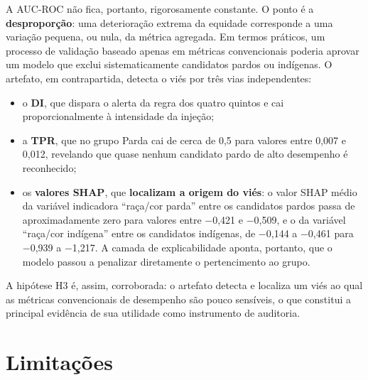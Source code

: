 A AUC-ROC não fica, portanto, rigorosamente constante. O ponto é a \textbf{desproporção}: uma deterioração extrema da equidade corresponde a uma variação pequena, ou nula, da métrica agregada. Em termos práticos, um processo de validação baseado apenas em métricas convencionais poderia aprovar um modelo que exclui sistematicamente candidatos pardos ou indígenas. O artefato, em contrapartida, detecta o viés por três vias independentes:
\begin{itemize}
    \item o \textbf{DI}, que dispara o alerta da regra dos quatro quintos e cai proporcionalmente à intensidade da injeção;
    \item a \textbf{TPR}, que no grupo Parda cai de cerca de 0,5 para valores entre 0,007 e 0,012, revelando que quase nenhum candidato pardo de alto desempenho é reconhecido;
    \item os \textbf{valores SHAP}, que \textbf{localizam a origem do viés}: o valor SHAP médio da variável indicadora ``raça/cor parda'' entre os candidatos pardos passa de aproximadamente zero para valores entre −0,421 e −0,509, e o da variável ``raça/cor indígena'' entre os candidatos indígenas, de −0,144 a −0,461 para −0,939 a −1,217. A camada de explicabilidade aponta, portanto, que o modelo passou a penalizar diretamente o pertencimento ao grupo.
\end{itemize}

A hipótese H3 é, assim, corroborada: o artefato detecta e localiza um viés ao qual as métricas convencionais de desempenho são pouco sensíveis, o que constitui a principal evidência de sua utilidade como instrumento de auditoria.

\section{Limitações}
\label{sec:res_limitacoes}


